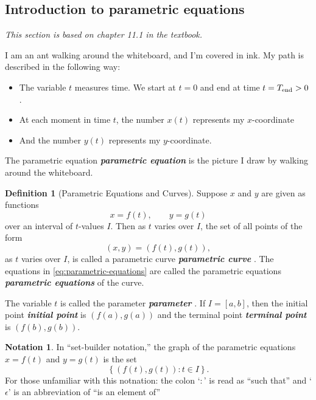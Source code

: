 \documentclass[10pt]{article}
\DeclareRobustCommand{\demph}[1]{%
  \ifmmode
  {\color{Blue}#1}%
  \else
  {\color{Blue}\bfseries\slshape #1}%
  \fi
}
\theoremstyle{definition}
\newtheorem{definition}[theorem]{Definition}
\newtheorem{notation}[theorem]{Notation}
\newcommand{\1}[1]{\textbf{1}_{\left[#1\right]}} %
\begin{document}
\subsection{Introduction to parametric equations}
\textit{This section is based on chapter 11.1 in the textbook.}


I am an ant walking around the whiteboard, and I'm covered in ink. My path is described in the following
way:
\begin{itemize}
  \item The variable $t$ measures time. We start at $t=0$ and end at time $t=T_{\rm end}>0$.
  \item At each moment in time $t$, the number $x(t)$ represents my $x$-coordinate
  \item And the number $y(t)$ represents my $y$-coordinate.
\end{itemize}
The \demph{parametric equation} is the picture I draw by walking around the whiteboard.


\begin{definition}[Parametric Equations and Curves]
  \label{def:parametric-equations-and-curves}
  Suppose $x$ and $y$ are given as functions
  \begin{equation*}
    x=f(t), \qquad y=g(t)
  \end{equation*}
  over an interval of $t$-values $I$. Then as $t$ varies over $I$, the set of all points of the form
  \begin{equation}\label{eq:parametric-equations}
    (x,y) = \left( f(t),g(t) \right),
  \end{equation}
  as $t$ varies over $I$, is called a \demph{parametric curve}. The equations
  in \cref{eq:parametric-equations} are called the \demph{parametric
    equations} of the curve.

  The variable $t$ is called the \demph{parameter}. If $I=[a,b]$, then the
  \demph{initial point} is $(f(a),g(a))$ and the \demph{terminal point} is
  $(f(b),g(b))$.
\end{definition}

\begin{notation}
  In ``set-builder notation,'' the graph of the parametric equations $x=f(t)$ and $y=g(t)$ is the set
  \begin{equation*}
    \left\{(f(t),g(t)) :  t \in  I \right\}.
  \end{equation*}
  For those unfamiliar with this notnation: the colon `$:$' is read as ``such that'' and  `$\epsilon$' is an abbreviation of ``is an element of''
\end{notation}
\end{document}
